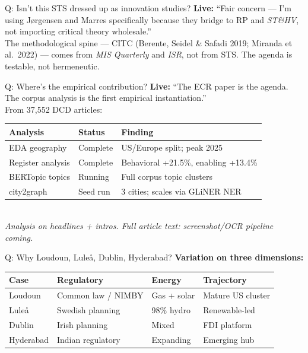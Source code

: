 \documentclass[aspectratio=169,11pt]{beamer}
\begin{document}
\appendix

\begin{frame}[noframenumbering]{\enspace Q: Isn't this STS dressed up as innovation studies?}
\footnotesize
\textbf{Live:} ``Fair concern — I'm using Jørgensen and Marres specifically because they bridge to RP and \textit{ST\&HV}, not importing critical theory wholesale.''\\[0.5em]
The methodological spine — CITC (Berente, Seidel \& Safadi 2019; Miranda et al.\ 2022) — comes from \textit{MIS Quarterly} and \textit{ISR}, not from STS. The agenda is testable, not hermeneutic.
\end{frame}

\begin{frame}[noframenumbering]{\enspace Q: Where's the empirical contribution?}
\footnotesize
\textbf{Live:} ``The ECR paper is the agenda. The corpus analysis is the first empirical instantiation.''\\[0.5em]
From 37,552 DCD articles:\\[0.3em]
\begin{tabular}{@{}lll@{}}
\toprule
\textbf{Analysis} & \textbf{Status} & \textbf{Finding} \\
\midrule
EDA geography     & Complete  & US/Europe split; peak 2025 \\
Register analysis & Complete  & Behavioral +21.5\%, enabling +13.4\% \\
BERTopic topics   & Running   & Full corpus topic clusters \\
city2graph        & Seed run  & 3 cities; scales via GLiNER NER \\
\bottomrule
\end{tabular}\\[0.3em]
\textcolor{dcgray}{\textit{Analysis on headlines + intros. Full article text: screenshot/OCR pipeline coming.}}
\end{frame}

\begin{frame}[noframenumbering]{\enspace Q: Why Loudoun, Luleå, Dublin, Hyderabad?}
\footnotesize
\textbf{Variation on three dimensions:}\\[0.4em]
\begin{tabular}{@{}llll@{}}
\toprule
\textbf{Case} & \textbf{Regulatory} & \textbf{Energy} & \textbf{Trajectory} \\
\midrule
Loudoun    & Common law / NIMBY  & Gas + solar  & Mature US cluster \\
Lule\aa    & Swedish planning    & 98\% hydro   & Renewable-led \\
Dublin     & Irish planning      & Mixed        & FDI platform \\
Hyderabad  & Indian regulatory   & Expanding    & Emerging hub \\
\bottomrule
\end{tabular}
\end{frame}
\end{document}
